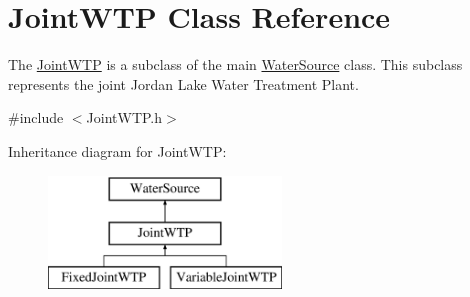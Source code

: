 \hypertarget{classJointWTP}{}\section{Joint\+W\+TP Class Reference}
\label{classJointWTP}


The {\ttfamily \mbox{\hyperlink{classJointWTP}{Joint\+W\+TP}}} is a subclass of the main {\ttfamily \mbox{\hyperlink{classWaterSource}{Water\+Source}}} class. This subclass represents the joint Jordan Lake Water Treatment Plant.  




{\ttfamily \#include $<$Joint\+W\+T\+P.\+h$>$}

Inheritance diagram for Joint\+W\+TP\+:\begin{figure}[H]
\begin{center}
\leavevmode
\includegraphics[height=3.000000cm]{classJointWTP}
\end{center}
\end{figure}
